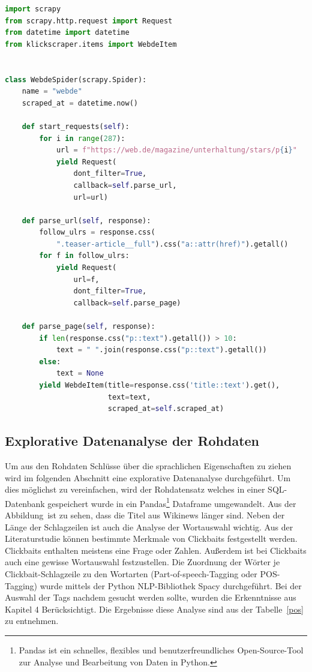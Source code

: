 \begin{lstlisting}[language=Python,caption=Beispiel eines Scrapers]
import scrapy
from scrapy.http.request import Request
from datetime import datetime
from klickscraper.items import WebdeItem


class WebdeSpider(scrapy.Spider):
    name = "webde"
    scraped_at = datetime.now()

    def start_requests(self):
        for i in range(287):
            url = f"https://web.de/magazine/unterhaltung/stars/p{i}"
            yield Request(
                dont_filter=True,
                callback=self.parse_url,
                url=url)

    def parse_url(self, response):
        follow_ulrs = response.css(
            ".teaser-article__full").css("a::attr(href)").getall()
        for f in follow_ulrs:
            yield Request(
                url=f,
                dont_filter=True,
                callback=self.parse_page)

    def parse_page(self, response):
        if len(response.css("p::text").getall()) > 10:
            text = " ".join(response.css("p::text").getall())
        else:
            text = None
        yield WebdeItem(title=response.css('title::text').get(),
                        text=text,
                        scraped_at=self.scraped_at)
\end{lstlisting}\label{Scrapy}


\subsection{Explorative Datenanalyse der Rohdaten}
Um aus den Rohdaten Schlüsse über die sprachlichen Eigenschaften zu ziehen wird im folgenden Abschnitt eine explorative Datenanalyse durchgeführt. Um dies möglichst zu vereinfachen, wird der Rohdatensatz welches in einer SQL-Datenbank gespeichert wurde in ein Pandas\footnote{Pandas ist ein schnelles, flexibles und benutzerfreundliches Open-Source-Tool zur Analyse und Bearbeitung von Daten in Python.} Dataframe umgewandelt.
Aus der Abbildung~ist zu sehen, dass die Titel aus Wikinews länger sind. Neben der Länge der Schlagzeilen ist auch die Analyse der Wortauswahl wichtig. Aus der Literaturstudie können bestimmte Merkmale von Clickbaits festgestellt werden. Clickbaits enthalten meistens eine Frage oder Zahlen. Außerdem ist bei Clickbaits auch eine gewisse Wortauswahl festzustellen. Die Zuordnung der Wörter je Clickbait-Schlagzeile zu den Wortarten (Part-of-speech-Tagging oder POS-Tagging) wurde mittels der Python NLP-Bibliothek Spacy durchgeführt. Bei der Auswahl der Tags nachdem gesucht werden sollte, wurden die Erkenntnisse aus Kapitel 4 Berücksichtigt. Die Ergebnisse diese Analyse sind aus der Tabelle~\ref{pos} zu entnehmen.

